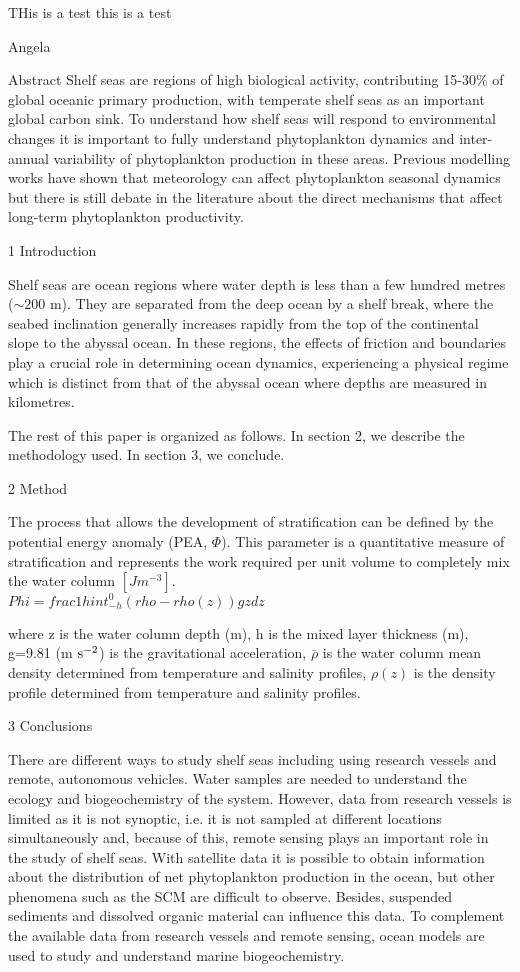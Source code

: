 \documentclass{article}
\begin{document}
THis is a test this is a test

Angela

Abstract
Shelf seas are regions of high biological activity, contributing 15-30\% of global oceanic primary production, with temperate shelf seas as an important global carbon sink. To understand how shelf seas will respond to environmental changes it is important to fully understand phytoplankton dynamics and inter-annual variability of phytoplankton production in these areas. Previous modelling works have shown that meteorology can affect phytoplankton seasonal dynamics but there is still debate in the literature about the direct mechanisms that affect long-term phytoplankton productivity. 


1 Introduction 

Shelf seas are ocean regions where water depth is less than a few hundred metres ($\sim 200$ m). They are separated from the deep ocean by a shelf break, where the seabed inclination generally increases rapidly from the top of the continental slope to the abyssal ocean. In these regions, the effects of friction and boundaries play a crucial role in determining ocean dynamics, experiencing a physical regime which is distinct from that of the abyssal ocean where depths are measured in kilometres. 

The rest of this paper is organized as follows. In section 2, we describe the methodology used. In section 3, we conclude.

2 Method

The process that allows the development of stratification can be defined by the potential energy anomaly (PEA, $\Phi$). This parameter is a quantitative measure of stratification and represents the work required per unit volume to completely mix the water column $[Jm^{-3}]$. \\

   $  Phi=frac{1}{h}int_{-h}^{0}({rho}-rho(z))gzdz $

where z is the water column depth (m), h is the mixed layer thickness (m), g=9.81 (m $\rm s^{-2}$) is the gravitational acceleration, $\bar{\rho}$ is the water column mean density determined from temperature and salinity profiles, $\rho(z)$ is the density profile determined from temperature and salinity 
profiles. 

3 Conclusions

There are different ways to study shelf seas including using research vessels and remote, autonomous vehicles. Water samples are needed to understand the ecology and biogeochemistry of the system. However, data from research vessels is limited as it is not synoptic, i.e. it is not sampled at different locations simultaneously and, because of this, remote sensing plays an important role in the study of shelf seas. With satellite data it is possible to obtain information about the distribution of net phytoplankton production in the ocean, but other phenomena such as the SCM are difficult to observe. Besides, suspended sediments and dissolved organic material can influence this data. To complement the available data from research vessels and remote sensing, ocean models are used to study and understand marine biogeochemistry. 
\end{document}
